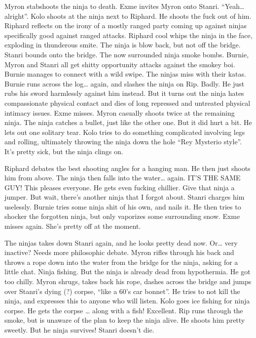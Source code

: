 \begin{multicols}{2}
Myron stabshoots the ninja to death. Exme invites Myron onto Stanri. “Yeah… alright”. Kolo shoots at the ninja next to Riphard. He shoots the fuck out of him. Riphard reflects on the irony of a mostly ranged party coming up against ninjas specifically good against ranged attacks. Riphard cool whips the ninja in the face, exploding in thunderous smite. The ninja is blow back, but not off the bridge. Stanri bounds onto the bridge. The now surrounded ninja smoke bombs. Burnie, Myron and Stanri all get shitty opportunity attacks against the smokey boi. Burnie manages to connect with a wild swipe. The ninjas miss with their katas. Burnie runs across the log… again, and slashes the ninja on Rip. Badly. He just rubs his sword harmlessly against him instead. But it turns out the ninja hates compassionate physical contact and dies of long repressed and untreated physical intimacy issues. Exme misses. Myron casually shoots twice at the remaining ninja. The ninja catches a bullet, just like the other one. But it did hurt a bit. He lets out one solitary tear. Kolo tries to do something complicated involving legs and rolling, ultimately throwing the ninja down the hole “Rey Mysterio style”. It’s pretty sick, but the ninja clings on.\medskip

Riphard debates the best shooting angles for a hanging man. He then just shoots him from above. The ninja then falls into the water… again. IT’S THE SAME GUY! This pleases everyone. He gets even fucking chillier. Give that ninja a jumper. But wait, there’s another ninja that I forgot about. Stanri charges him uselessly. Burnie tries some ninja shit of his own, and nails it. He then tries to shocker the forgotten ninja, but only vaporizes some surrounding snow. Exme misses again. She’s pretty off at the moment.\medskip

The ninjas takes down Stanri again, and he looks pretty dead now. Or… very inactive? Needs more philosophic debate. Myron rifles through his back and throws a rope down into the water from the bridge for the ninja, asking for a little chat. Ninja fishing. But the ninja is already dead from hypothermia. He got too chilly. Myron shrugs, takes back his rope, dashes across the bridge and jumps over Stanri’s dying (?) corpse, “like a 60’s car bonnet”. He tries to not kill the ninja, and expresses this to anyone who will listen. Kolo goes ice fishing for ninja corpse. He gets the corpse … along with a fish! Excellent. Rip runs through the smoke, but is unaware of the plan to keep the ninja alive. He shoots him pretty sweetly. But he ninja survives! Stanri doesn’t die.\medskip


\end{multicols}
